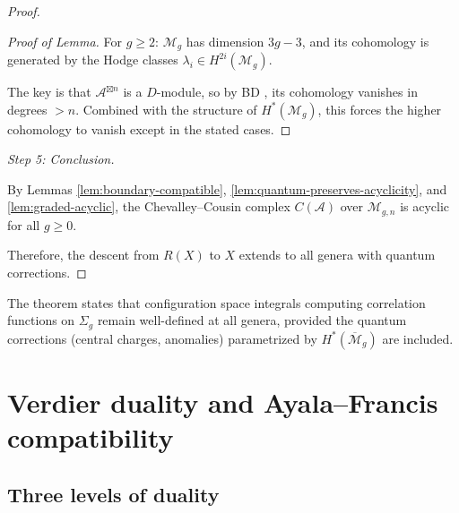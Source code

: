 \begin{proof}
\begin{proof}[Proof of Lemma]
For $g \geq 2$: $\mathcal{M}_g$ has dimension $3g-3$, and its cohomology is generated
by the Hodge classes $\lambda_i \in H^{2i}(\mathcal{M}_g)$.

The key is that $\mathcal{A}^{\boxtimes n}$ is a $D$-module, so by BD \cite[Lemma 4.2.10]{BD04},
its cohomology vanishes in degrees $> n$. Combined with the structure of $H^*(\mathcal{M}_g)$,
this forces the higher cohomology to vanish except in the stated cases.
\end{proof}

\emph{Step 5: Conclusion.}

By Lemmas \ref{lem:boundary-compatible}, \ref{lem:quantum-preserves-acyclicity}, and
\ref{lem:graded-acyclic}, the Chevalley--Cousin complex $C(\mathcal{A})$ over
$\mathcal{M}_{g,n}$ is acyclic for all $g \geq 0$.

Therefore, the descent from $R(X)$ to $X$ extends to all genera with quantum corrections.
\end{proof}

\begin{remark}\label{rem:physical-higher-genus-descent}
The theorem states that configuration space integrals computing correlation functions on $\Sigma_g$ remain well-defined at all genera, provided the quantum corrections (central charges, anomalies) parametrized by $H^*(\overline{\mathcal{M}}_g)$ are included.
\end{remark}

\section[Verdier duality and Ayala-Francis compatibility]{Verdier duality and Ayala--Francis compatibility}
\label{sec:verdier-ayala-francis}

\subsection{Three levels of duality}
\label{subsec:three-dualities}

